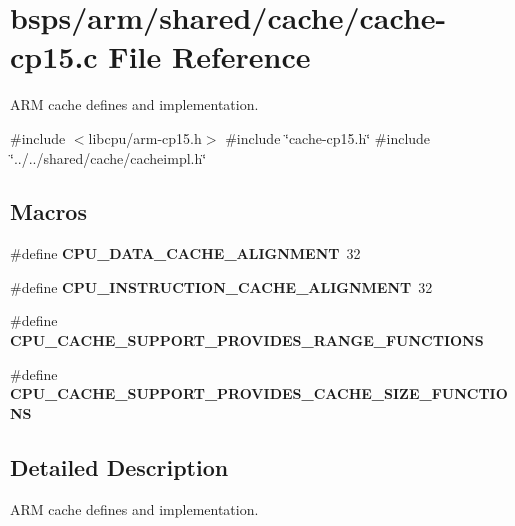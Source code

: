 \hypertarget{cache-cp15_8c}{}\section{bsps/arm/shared/cache/cache-\/cp15.c File Reference}
\label{cache-cp15_8c}


A\+RM cache defines and implementation.  


{\ttfamily \#include $<$libcpu/arm-\/cp15.\+h$>$}\newline
{\ttfamily \#include \char`\"{}cache-\/cp15.\+h\char`\"{}}\newline
{\ttfamily \#include \char`\"{}../../shared/cache/cacheimpl.\+h\char`\"{}}\newline
\subsection*{Macros}
\begin{DoxyCompactItemize}
\item 
\mbox{\label{cache-cp15_8c_ad8b098569fd4a1d9ae5a3030b66ac6f8}} 
\#define {\bfseries C\+P\+U\+\_\+\+D\+A\+T\+A\+\_\+\+C\+A\+C\+H\+E\+\_\+\+A\+L\+I\+G\+N\+M\+E\+NT}~32
\item 
\mbox{\label{cache-cp15_8c_a9e6d2e28bbbf191bf0da3d6e6160542c}} 
\#define {\bfseries C\+P\+U\+\_\+\+I\+N\+S\+T\+R\+U\+C\+T\+I\+O\+N\+\_\+\+C\+A\+C\+H\+E\+\_\+\+A\+L\+I\+G\+N\+M\+E\+NT}~32
\item 
\mbox{\label{cache-cp15_8c_add0d5bbddb9202faf766bc6a929d85b2}} 
\#define {\bfseries C\+P\+U\+\_\+\+C\+A\+C\+H\+E\+\_\+\+S\+U\+P\+P\+O\+R\+T\+\_\+\+P\+R\+O\+V\+I\+D\+E\+S\+\_\+\+R\+A\+N\+G\+E\+\_\+\+F\+U\+N\+C\+T\+I\+O\+NS}
\item 
\mbox{\label{cache-cp15_8c_a5779289bb722802e24164ca21ed9a1c4}} 
\#define {\bfseries C\+P\+U\+\_\+\+C\+A\+C\+H\+E\+\_\+\+S\+U\+P\+P\+O\+R\+T\+\_\+\+P\+R\+O\+V\+I\+D\+E\+S\+\_\+\+C\+A\+C\+H\+E\+\_\+\+S\+I\+Z\+E\+\_\+\+F\+U\+N\+C\+T\+I\+O\+NS}
\end{DoxyCompactItemize}


\subsection{Detailed Description}
A\+RM cache defines and implementation. 

